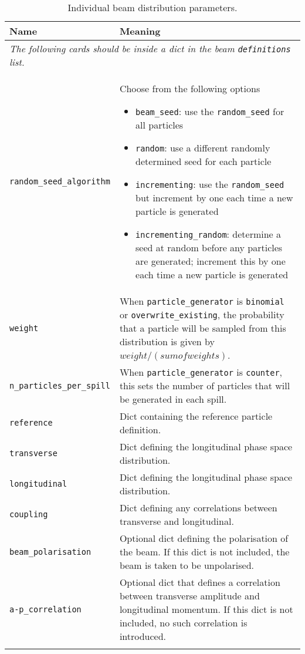 \begin{table*}
\begin{center}
\caption{Individual beam distribution parameters.}
\begin{tabularx}{\linewidth}{lX}
Name & Meaning \\
\hline
\multicolumn{2}{l}{\emph{The following cards should be inside a dict in the beam \verb|definitions| list.}} \\
\hline
\verb|random_seed_algorithm| & Choose from the following options
                          \begin{itemize}
                            \setlength{\itemsep}{0mm}
                            \item \verb|beam_seed|: use the \verb|random_seed| for all particles
                            \item \verb|random|: use a different randomly determined seed for each particle
                            \item \verb|incrementing|: use the \verb|random_seed| but increment by one each time a new particle is generated
                            \item \verb|incrementing_random|: determine a seed at random before any particles are generated; increment this by one each time a new particle is generated
                          \end{itemize}\\
\verb|weight| & When \verb|particle_generator| is \verb|binomial| or \verb|overwrite_existing|, the probability that a particle will be sampled from this distribution is given by $weight/(sumofweights)$.\\
\verb|n_particles_per_spill| & When \verb|particle_generator| is \verb|counter|, this sets the number of particles that will be generated in each spill. \\
\verb|reference| & Dict containing the reference particle definition. \\
\verb|transverse| & Dict defining the longitudinal phase space distribution. \\
\verb|longitudinal| & Dict defining the longitudinal phase space distribution. \\
\verb|coupling| & Dict defining any correlations between transverse and longitudinal. \\
\verb|beam_polarisation| & Optional dict defining the polarisation of the beam. If this dict is not included, the beam is taken to be unpolarised. \\
\verb|a-p_correlation| & Optional dict that defines a correlation between transverse amplitude and longitudinal momentum. If this dict is not included, no such correlation is introduced. \\
\begin{makeimage} %
\end{makeimage} 
\end{tabularx}
\end{center}
\end{table*}

